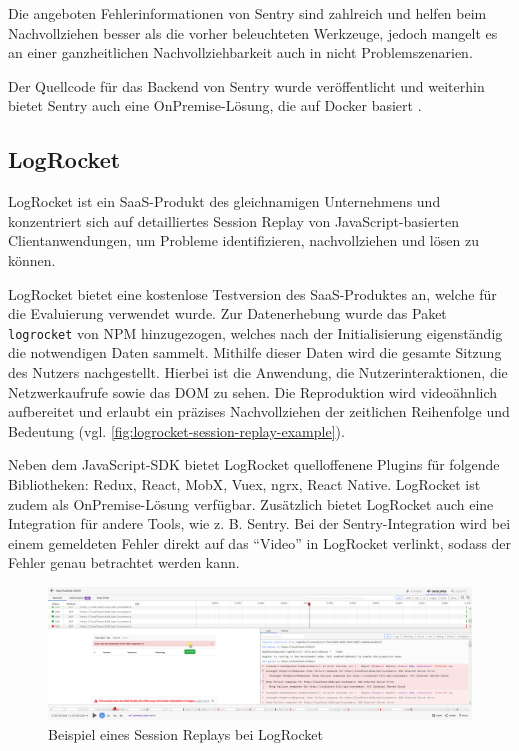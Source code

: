 Die angeboten Fehlerinformationen von Sentry sind zahlreich und helfen beim Nachvollziehen besser als die vorher beleuchteten Werkzeuge, jedoch mangelt es an einer ganzheitlichen Nachvollziehbarkeit auch in nicht Problemszenarien.

Der Quellcode für das Backend von Sentry wurde veröffentlicht und weiterhin bietet Sentry auch eine OnPremise-Lösung, die auf Docker basiert \cite{SentrySelfHosted}.

\subsection{LogRocket}

LogRocket \cite{LogRocket} ist ein SaaS-Produkt des gleichnamigen Unternehmens und konzentriert sich auf detailliertes Session Replay von JavaScript-basierten Clientanwendungen, um Probleme identifizieren, nachvollziehen und lösen zu können.

LogRocket bietet eine kostenlose Testversion des SaaS-Produktes an, welche für die Evaluierung verwendet wurde. Zur Datenerhebung wurde das Paket \texttt{logrocket} von NPM hinzugezogen, welches nach der Initialisierung eigenständig die notwendigen Daten sammelt. Mithilfe dieser Daten wird die gesamte Sitzung des Nutzers nachgestellt. Hierbei ist die Anwendung, die Nutzerinteraktionen, die Netzwerkaufrufe sowie das DOM zu sehen. Die Reproduktion wird videoähnlich aufbereitet und erlaubt ein präzises Nachvollziehen der zeitlichen Reihenfolge und Bedeutung (vgl. \autoref{fig:logrocket-session-replay-example}).

Neben dem JavaScript-SDK bietet LogRocket quelloffenene Plugins für folgende Bibliotheken: Redux, React, MobX, Vuex, ngrx, React Native. LogRocket ist zudem als OnPremise-Lösung verfügbar. Zusätzlich bietet LogRocket auch eine Integration für andere Tools, wie z. B. Sentry. Bei der Sentry-Integration wird bei einem gemeldeten Fehler direkt auf das \enquote{Video} in LogRocket verlinkt, sodass der Fehler genau betrachtet werden kann.

\begin{figure}[H]
	\centering
	\includegraphics[width=\linewidth]{img/03_methoden/logrocket_session-replay-example.png}
	\caption{Beispiel eines Session Replays bei LogRocket}
	\label{fig:logrocket-session-replay-example}
\end{figure}

